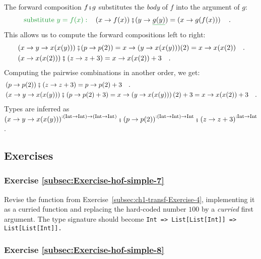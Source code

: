 The forward composition $f\bef g$ substitutes the \emph{body} of
$f$ into the argument of $g$:
\begin{align*}
{\color{greenunder}\text{substitute }y=f(x):}\quad & \left(x\rightarrow f(x)\right)\bef(y\rightarrow\gunderline{g(y)})=\left(x\rightarrow g(f(x))\right)\quad.
\end{align*}
This allows us to compute the forward compositions left to right:
\begin{align*}
 & \left(x\rightarrow y\rightarrow x(x(y))\right)\bef(p\rightarrow p(2))=x\rightarrow(y\rightarrow x(x(y)))(2)=x\rightarrow x(x(2))\quad.\\
 & \left(x\rightarrow x(x(2))\right)\bef\left(z\rightarrow z+3\right)=x\rightarrow x(x(2))+3\quad.
\end{align*}
Computing the pairwise combinations in another order, we get:
\begin{align*}
 & \left(p\rightarrow p(2)\right)\bef\left(z\rightarrow z+3\right)=p\rightarrow p(2)+3\quad.\\
 & \left(x\rightarrow y\rightarrow x(x(y))\right)\bef\left(p\rightarrow p(2)+3\right)=x\rightarrow\left(y\rightarrow x(x(y))\right)(2)+3=x\rightarrow x(x(2))+3\quad.
\end{align*}
Types are inferred as $\left(x\rightarrow y\rightarrow x(x(y))\right)^{:(\text{Int}\rightarrow\text{Int})\rightarrow(\text{Int}\rightarrow\text{Int})}\bef\left(p\rightarrow p(2)\right)^{:(\text{Int}\rightarrow\text{Int})\rightarrow\text{Int}}\bef\left(z\rightarrow z+3\right)^{:\text{Int}\rightarrow\text{Int}}$.

\subsection{Exercises}

\subsubsection{Exercise \label{subsec:Exercise-hof-simple-7}\ref{subsec:Exercise-hof-simple-7}}

Revise the function from Exercise~\ref{subsec:ch1-transf-Exercise-4},
implementing it as a curried function and replacing the hard-coded
number $100$ by a \emph{curried} first argument. The type signature
should become \texttt{}\lstinline!Int => List[List[Int]] => List[List[Int]]!\texttt{.}

\subsubsection{Exercise \label{subsec:Exercise-hof-simple-8}\ref{subsec:Exercise-hof-simple-8}}

